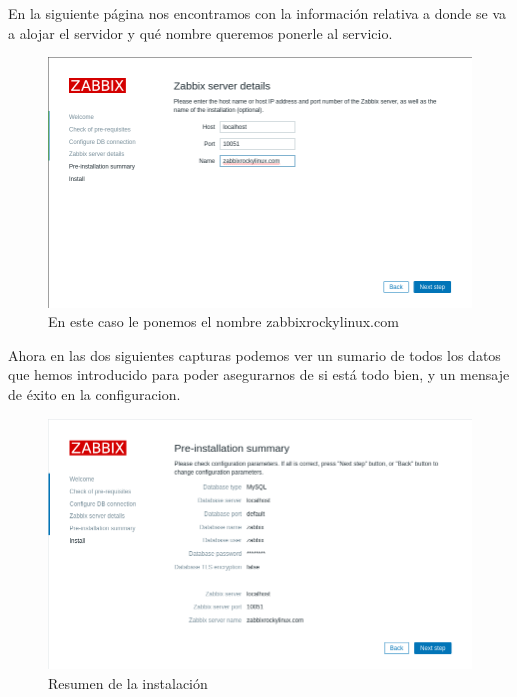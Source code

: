 En la siguiente página nos encontramos con la información relativa a donde se va a alojar el servidor y qué nombre queremos ponerle al servicio.

\begin{figure}[H]
	\centering
	\includegraphics[scale=0.4]{graphics/img8}
	\caption{En este caso le ponemos el nombre zabbixrockylinux.com}
\end{figure}

Ahora en las dos siguientes capturas podemos ver un sumario de todos los datos que hemos introducido para poder asegurarnos de si está todo bien, y un mensaje de éxito en la configuracion.

\begin{figure}[H]
	\centering
	\includegraphics[scale=0.4]{graphics/img9}
	\caption{Resumen de la instalación}
\end{figure}


